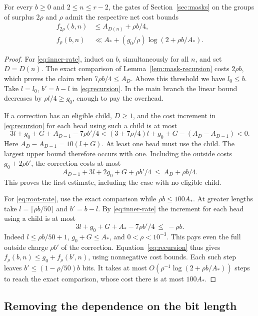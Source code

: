 \begin{lemma}\label{lem:two-rates}
For every \(b\ge0\) and \(2\le n\le r-2\), the gates of
Section~\ref{sec:masks} on the groups of surplus \(2\rho\) and \(\rho\)
admit the respective net cost bounds
\begin{align}
 f_{2\rho}(b,n)&\le A_{D(n)}+\rho b/4, \label{eq:inner-rate}\\
 f_\rho(b,n)&\ll A_*+(g_0/\rho)\log(2+\rho b/A_*).
 \label{eq:root-rate}
\end{align}
\end{lemma}
\begin{proof}
For \eqref{eq:inner-rate}, induct on \(b\), simultaneously for all
\(n\), and set \(D=D(n)\). The exact comparison of
Lemma~\ref{lem:mask-recursion} costs \(2\rho b\), which proves the
claim when \(7\rho b/4\le A_D\). Above this threshold we have
\(l_0\le b\). Take \(l=l_0\), \(b'=b-l\) in \eqref{eq:recursion}.
In the main branch the linear bound decreases by
\(\rho l/4\ge g_0\), enough to pay the overhead.

If a correction has an eligible child, \(D\ge1\), and the cost
increment in \eqref{eq:recursion} for each head using such a child
is at most
\[
  3l+g_0+G+A_{D-1}-7\rho b'/4
  < (3+7\rho/4)l+g_0+G-(A_D-A_{D-1})<0 .
\]
Here \(A_D-A_{D-1}=10(l+G)\). At least one head must use the child.
The largest upper bound therefore occurs with one. Including the
outside costs \(g_0+2\rho b'\), the correction costs at most
\[
 A_{D-1}+3l+2g_0+G+\rho b'/4\ \le\ A_D+\rho b/4 .
\]
This proves the first estimate, including the case with no eligible child.

For \eqref{eq:root-rate}, use the exact comparison while
\(\rho b\le100A_*\). At greater lengths take
\(l=\lceil\rho b/50\rceil\) and \(b'=b-l\). By \eqref{eq:inner-rate}
the increment for each head using a child is at most
\[
  3l+g_0+G+A_*-7\rho b'/4\ \le\ -\rho b .
\]
Indeed \(l\le\rho b/50+1\), \(g_0+G\le A_*\), and
\(0<\rho<10^{-3}\). This pays even the full outside charge \(\rho b'\)
of the correction. Equation~\eqref{eq:recursion} thus gives
\(f_\rho(b,n)\le g_0+f_\rho(b',n)\), using nonnegative cost bounds.
Each such step leaves \(b'\le(1-\rho/50)b\) bits. It takes at most
\(O(\rho^{-1}\log(2+\rho b/A_*))\) steps to reach the exact comparison,
whose cost there is at most \(100A_*\).
\end{proof}

\subsection{Removing the dependence on the bit length}

